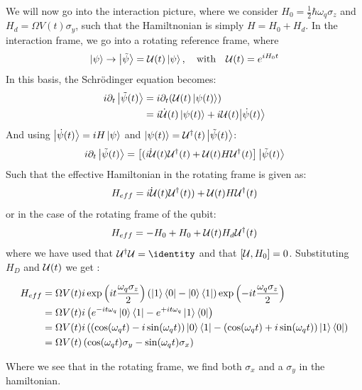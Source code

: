 We will now go into the interaction picture, where we consider $H_0 = \frac{1}{2} \hbar \omega_{q} \sigma_z$ and $H_d = \Omega V(t) \sigma_y$, such that the Hamiltnonian is simply $H = H_0 + H_d$. In the interaction frame, we go into a rotating reference frame, where
\begin{equation}
    \ket{\psi} \to \ket{\tilde{\psi}} = \mathcal{U}(t)\ket{\psi}, \quad \text{with}\quad \mathcal{U}(t) = e^{iH_0 t}
\end{equation}
In this basis, the Schrödinger equation becomes:
\begin{align*}
    i\partial_t \ket{\tilde{\psi}(t)} &= i \partial_t (\mathcal{U}(t) \ket{{\psi}(t)}) \\
    &= i \dot{\mathcal{U}}(t)\ket{\psi(t)} + i \mathcal{U}(t) {\ket{\Dot{{\psi}}(t)}}
\end{align*}
And using $\ket{\dot{\psi}(t)} = i H \ket{\psi}$ and $\ket{\psi(t)} = \mathcal{U}^\dagger(t) \ket{\tilde{\psi}(t)}$:
\begin{equation}
    i \partial_t \ket{\Tilde{\psi}(t)}= \left[(\dot{i \mathcal{U}}{(t)}\mathcal{U}^\dagger(t) + \mathcal{U}(t) H \mathcal{U}^\dagger(t)\right]\ket{\tilde{\psi}(t)}
\end{equation}
Such that the effective Hamiltonian in the rotating frame is given as:
\begin{equation}
    H_{eff} = \dot{i \mathcal{U}}{(t)}\mathcal{U}^\dagger(t)) + \mathcal{U}(t) H \mathcal{U}^\dagger(t)
\end{equation}
or in the case of the rotating frame of the qubit:
\begin{equation}
    H_{eff} = - H_0 + H_0 + \mathcal{U}(t) H_d \mathcal{U}^\dagger(t)
\end{equation}
where we have used that $\unitary^\dagger \unitary = \identity$ and that $\comm{\unitary}{H_0} = 0$. Substituting $H_D$ and $\mathcal{U}(t)$ we get \cite{krantz_quantum_2019}:
\begin{fullwidth}
\begin{align}
    H_{eff} &= \Omega V(t) i \exp\left(it\frac{\omega_q \sigma_z}{2}\right)  (\ket{1}\bra{0} - \ket{0}\bra{1} )\exp\left(-it\frac{\omega_q \sigma_z}{2}\right) \\
            &= \Omega V(t) i \left(e^{-it\omega_q}\ket{0}\bra{1} -  e^{+it\omega_q}\ket{1}\bra{0} \right) \\
            &= \Omega V(t) i \left((\cos(\omega_q t) - i\sin(\omega_q t))\ket{0}\bra{1} -  (\cos(\omega_q t) + i\sin(\omega_q t))\ket{1}\bra{0} \right) \\
            &= \Omega V(t) \left(\cos(\omega_q t)\sigma_y - \sin(\omega_q t) \sigma_x \right)
\end{align}
\end{fullwidth}
Where we see that in the rotating frame, we find both $\sigma_x$ and a $\sigma_y$ in the hamiltonian.

